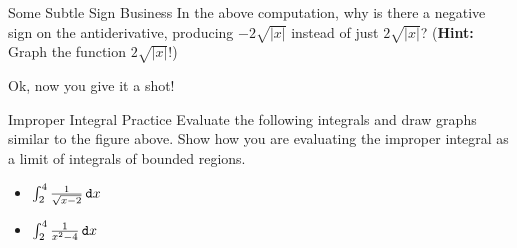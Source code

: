 \begin{exercise}{Some Subtle Sign Business \Coffeecup}
In the above computation, why is there a negative sign on the antiderivative, producing $-2\sqrt{|x|}$ instead of just $2\sqrt{|x|}$?  ({\bf Hint:} Graph the function $2\sqrt{|x|}$!)
\end{exercise}

Ok, now you give it a shot!  
\begin{exercise}{Improper Integral Practice \Coffeecup \Coffeecup}
Evaluate the following integrals and draw graphs similar to the figure above.  Show how you are evaluating the improper integral as a limit of integrals of bounded regions.
\begin{itemize}
\item $\int_{2}^4\frac{1}{\sqrt{x-2}}\mathop{}\!\mathtt{d} x $


\item $ \int_{2}^4 \frac{1}{x^2-4}\mathop{}\!\mathtt{d} x $



\end{itemize}
\end{exercise}
